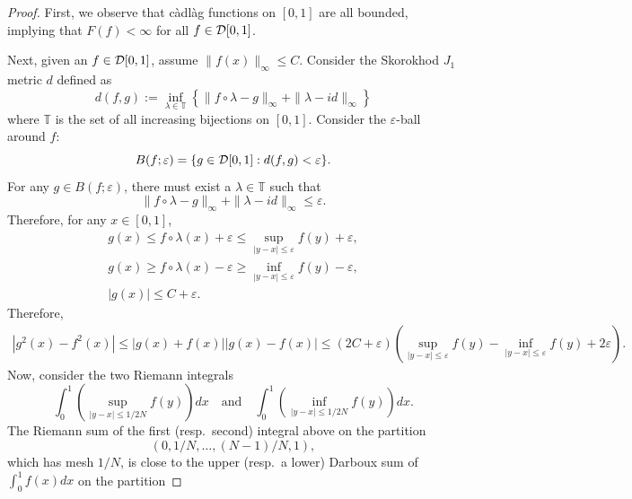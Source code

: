 \begin{proof}
    First, we observe that c\`adl\`ag functions on $[0,1]$ are all bounded, implying that $F(f) < \infty$ for all $f \in \mathcal{D}[0,1]$.

    Next, given an $f \in \mathcal{D}[0,1]$, assume $\|f(x)\|_\infty \le C$. Consider the Skorokhod $J_1$ metric $d$ defined as
    \begin{equation}
       d(f,g) := \inf_{\lambda \in \mathbb T} \left\{ \|f\circ \lambda - g\|_\infty + \|\lambda - id \|_\infty \right\}
    \end{equation}
    where $\mathbb T$ is the set of all increasing bijections on $[0,1]$. Consider the $\varepsilon$-ball around $f$:
    \begin{equation}
        B(f;\varepsilon) = \{ g \in \mathcal{D}[0,1] : d(f,g)<\varepsilon \}.
    \end{equation}
    For any $g\in B(f;\varepsilon)$, there must exist a $\lambda\in \mathbb T$ such that
    \begin{equation}
         \|f\circ \lambda - g\|_\infty + \|\lambda - id \|_\infty \le \varepsilon.
    \end{equation}
    Therefore, for any $x \in [0,1]$,
    \begin{gather}
        g(x) \le f\circ\lambda(x) + \varepsilon \le \sup_{|y-x|\le\varepsilon} f(y) + \varepsilon,
        \\
        g(x) \ge f\circ\lambda(x) - \varepsilon \ge \inf_{|y-x|\le\varepsilon} f(y) - \varepsilon,
        \\
        |g(x)| \le C + \varepsilon.
    \end{gather}
    Therefore,
    \begin{align}
        |g^2(x) - f^2(x)| \le |g(x) + f(x)||g(x)-f(x)| \le (2C+\varepsilon)\left( \sup_{|y-x|\le \varepsilon}f(y) - \inf_{|y-x|\le \varepsilon}f(y) + 2\varepsilon\right).
    \end{align}
    Now, consider the two Riemann integrals
    \begin{equation}
        \int_0^1 \left(\sup_{|y-x|\le 1/2N}f(y) \right) dx \quad \text{and} \quad \int_0^1 \left(\inf_{|y-x|\le 1/2N}f(y)\right) dx.
    \end{equation}
    The Riemann sum of the first (resp.\ second) integral above on the partition
    \begin{equation}
        (0, 1/N, \dots, (N-1)/N, 1 ),
    \end{equation}
    which has mesh $1/N$,
    is close to the upper (resp.\ a lower) Darboux sum of $\int_0^1 f(x) dx$ on the partition

\end{proof}

